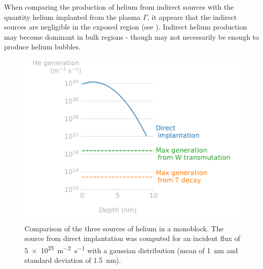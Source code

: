 When comparing the production of helium from indirect sources with the quantity helium implanted from the plasma $\Gamma$, it appears that the indirect sources are negligible in the exposed region (see ).
Indirect helium production may become dominant in bulk regions - though may not necessarily be enough to produce helium bubbles.

\begin{figure}
    \centering
    \includegraphics[width=\linewidth]{Figures/Chapter5/helium_generation.pdf}
    \caption{Comparison of the three sources of helium in a \gls{monoblock}. The source from direct implantation was computed for an incident flux of \SI{5e25}{m^{-2}.s^{-1}} with a gaussian distribution (mean of \SI{1}{nm} and standard deviation of \SI{1.5}{nm}).}
\end{figure}